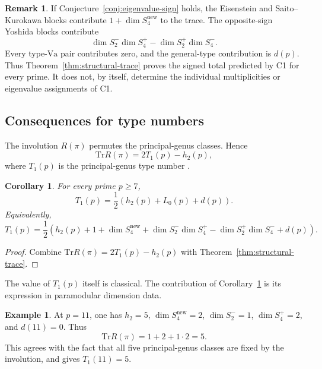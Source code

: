 \documentclass[11pt]{amsart}
\theoremstyle{plain}
\newtheorem{corollary}[theorem]{Corollary}
\theoremstyle{definition}
\newtheorem{remark}[theorem]{Remark}
\newtheorem{example}[theorem]{Example}
\newcommand{\Tr}{\mathrm{Tr}}
\newcommand{\Va}{\mathrm{Va}}
\newcommand{\snew}{S^{\mathrm{new}}}
\providecommand{\Va}{\mathrm{Va}}
\providecommand{\snew}{S^{\mathrm{new}}}
\begin{document}
	\begin{remark}	\label{rem:trace-consistency}
		If Conjecture~\ref{conj:eigenvalue-sign} holds, the Eisenstein and
		Saito--Kurokawa blocks contribute $1+\dim\snew_4$ to the trace. The
		opposite-sign Yoshida blocks contribute
		\[
		\dim S_2^-\dim S_4^+-\dim S_2^+\dim S_4^-.
		\]
		Every type-$\Va$ pair contributes zero, and the general-type contribution
		is $d(p)$. Thus Theorem~\ref{thm:structural-trace} proves the signed total
		predicted by C1 for every prime. It does not, by itself, determine the
		individual multiplicities or eigenvalue assignments of C1.
	\end{remark}
	
	\subsection{Consequences for type numbers}
	\label{ss:type-number-trace}
	
	The involution $R(\pi)$ permutes the principal-genus classes. Hence
	\[
	\Tr R(\pi)=2T_1(p)-h_2(p),
	\]
	where $T_1(p)$ is the principal-genus type number
	\cite{IbukiyamaKatsura,Ibukiyama2018type}.
	
	\begin{corollary}\label{cor:typenum}
		For every prime $p\ge7$,
		\begin{equation}\label{eq:type-number-paramodular}
			T_1(p)=\frac12\left(h_2(p)+L_0(p)+d(p)\right).
		\end{equation}
		Equivalently,
		\[
		T_1(p)=\frac12\left(
		h_2(p)+1+\dim\snew_4
		+\dim S_2^-\dim S_4^+
		-\dim S_2^+\dim S_4^-
		+d(p)
		\right).
		\]
	\end{corollary}
	
	\begin{proof}
		Combine $\Tr R(\pi)=2T_1(p)-h_2(p)$ with
		Theorem~\ref{thm:structural-trace}.
	\end{proof}
	
	The value of $T_1(p)$ itself is classical. The contribution of
	Corollary~\ref{cor:typenum} is its expression in paramodular dimension data.
	
	\begin{example}\label{ex:trace-p11}
		At $p=11$, one has $h_2=5$, $\dim\snew_4=2$,
		$\dim S_2^-=1$, $\dim S_4^+=2$, and $d(11)=0$. Thus
		\[
		\Tr R(\pi)=1+2+1\cdot2=5.
		\]
		This agrees with the fact that all five principal-genus classes are fixed
		by the involution, and gives $T_1(11)=5$.
	\end{example}
	
\end{document}
